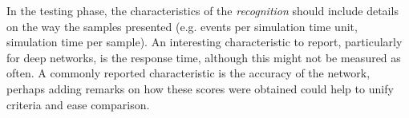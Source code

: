 
In the testing phase, the characteristics of the \emph{recognition} should include details on the way the samples presented (e.g. events per simulation time unit, simulation time per sample). An interesting characteristic to report, particularly for deep networks, is the response time, although this might not be measured as often. A commonly reported characteristic is the accuracy of the network, perhaps adding remarks on how these scores were obtained could help to unify criteria and ease comparison.











